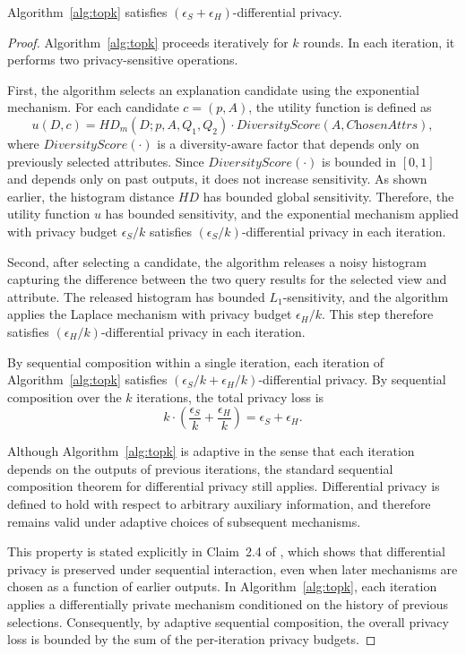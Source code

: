 \begin{proposition}
\label{thm:alg2-dp}
Algorithm~\ref{alg:topk} satisfies $(\epsilon_S + \epsilon_H)$-differential privacy.
\end{proposition}

\begin{proof}
Algorithm~\ref{alg:topk} proceeds iteratively for $k$ rounds. In each iteration, it performs two privacy-sensitive operations.

First, the algorithm selects an explanation candidate using the exponential mechanism. For each candidate $c = (p,A)$, the utility function is defined as
\[
u(D,c) = HD_m(D; p, A, Q_1, Q_2) \cdot DiversityScore(A, \textit{ChosenAttrs}),
\]
where $DiversityScore(\cdot)$ is a diversity-aware factor that depends only on previously selected attributes. Since $DiversityScore(\cdot)$ is bounded in $[0,1]$ and depends only on past outputs, it does not increase sensitivity. As shown earlier, the histogram distance $HD$ has bounded global sensitivity. Therefore, the utility function $u$ has bounded sensitivity, and the exponential mechanism applied with privacy budget $\epsilon_S/k$ satisfies $(\epsilon_S/k)$-differential privacy in each iteration.

Second, after selecting a candidate, the algorithm releases a noisy histogram capturing the difference between the two query results for the selected view and attribute. The released histogram has bounded $L_1$-sensitivity, and the algorithm applies the Laplace mechanism with privacy budget $\epsilon_H/k$. This step therefore satisfies $(\epsilon_H/k)$-differential privacy in each iteration.

By sequential composition within a single iteration, each iteration of Algorithm~\ref{alg:topk} satisfies $(\epsilon_S/k + \epsilon_H/k)$-differential privacy. By sequential composition over the $k$ iterations, the total privacy loss is
\[
k \cdot \left(\frac{\epsilon_S}{k} + \frac{\epsilon_H}{k}\right)
= \epsilon_S + \epsilon_H.
\]

Although Algorithm~\ref{alg:topk} is adaptive in the sense that each iteration depends on the outputs of previous iterations, the standard sequential composition theorem for differential privacy still applies. Differential privacy is defined to hold with respect to arbitrary auxiliary information, and therefore remains valid under adaptive choices of subsequent mechanisms.

This property is stated explicitly in Claim~2.4 of \cite{DBLP:series/synthesis/2016Li}, which shows that differential privacy is preserved under sequential interaction, even when later mechanisms are chosen as a function of earlier outputs. In Algorithm~\ref{alg:topk}, each iteration applies a differentially private mechanism conditioned on the history of previous selections. Consequently, by adaptive sequential composition, the overall privacy loss is bounded by the sum of the per-iteration privacy budgets.


\end{proof}
